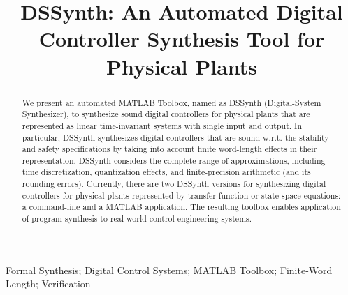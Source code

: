 \documentclass[10pt,conference]{IEEEtran}
\begin{document}
\title{DSSynth: An Automated Digital Controller Synthesis Tool for Physical Plants} 

\author{
}

			
\maketitle

\begin{abstract}
We present an automated MATLAB Toolbox, named as DSSynth 
(Digital-System Synthesizer), to synthesize sound digital controllers 
for physical plants that are represented as linear time-invariant
systems with single input and output. In particular, DSSynth synthesizes digital 
controllers that are sound w.r.t. the stability and safety specifications by taking into account finite word-length 
effects in their representation. DSSynth considers the complete range
of approximations, including time discretization, quantization effects, 
and finite-precision arithmetic (and its rounding errors). 
Currently, there are two DSSynth versions for synthesizing digital controllers for physical plants 
represented by transfer function or state-space equations: a command-line and 
a MATLAB application. The resulting toolbox 
enables application of program synthesis to real-world control engineering systems.
\end{abstract}

%
%
\begin{IEEEkeywords}
Formal Synthesis; Digital Control Systems; MATLAB Toolbox; Finite-Word Length; Verification
\end{IEEEkeywords}
\end{document}
